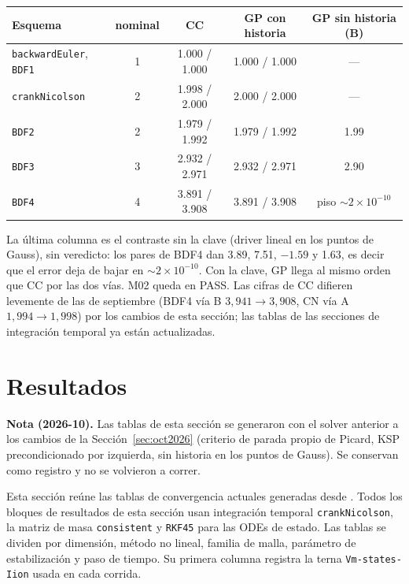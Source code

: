 \documentclass[11pt,a4paper]{article}
\newcommand{\code}[1]{\texttt{\small #1}}
\begin{document}
\begin{center}
\begin{tabular}{@{}lcccc@{}}
\toprule
Esquema & nominal & CC & GP con historia & GP sin historia (B) \\
\midrule
\code{backwardEuler}, \code{BDF1} & 1 & 1.000 / 1.000 & 1.000 / 1.000 & --- \\
\code{crankNicolson} & 2 & 1.998 / 2.000 & 2.000 / 2.000 & --- \\
\code{BDF2} & 2 & 1.979 / 1.992 & 1.979 / 1.992 & 1.99 \\
\code{BDF3} & 3 & 2.932 / 2.971 & 2.932 / 2.971 & 2.90 \\
\code{BDF4} & 4 & 3.891 / 3.908 & 3.891 / 3.908 & piso $\sim2\times10^{-10}$ \\
\bottomrule
\end{tabular}
\end{center}

La última columna es el contraste sin la clave (driver lineal en los puntos de Gauss), sin
veredicto: los pares de BDF4 dan 3.89, 7.51, $-1.59$ y 1.63, es decir que el error deja de
bajar en $\sim2\times10^{-10}$. Con la clave, GP llega al mismo orden que CC por las dos vías.
M02 queda en PASS. Las cifras de CC difieren levemente de las de septiembre (BDF4 vía B
$3{,}941\to3{,}908$, CN vía A $1{,}994\to1{,}998$) por los cambios de esta sección; las tablas
de las secciones de integración temporal ya están actualizadas.

\section{Resultados}
\label{sec:mms-results}

\textbf{Nota (2026-10).} Las tablas de esta sección se generaron con el solver anterior a los
cambios de la Sección~\ref{sec:oct2026} (criterio de parada propio de Picard, KSP
precondicionado por izquierda, sin historia en los puntos de Gauss). Se conservan como
registro y no se volvieron a correr.

Esta sección reúne las tablas de convergencia actuales generadas desde
.
Todos los bloques de resultados de esta sección usan integración temporal \code{crankNicolson},
la matriz de masa \code{consistent} y \code{RKF45} para las ODEs de estado. Las tablas se
dividen por dimensión, método no lineal, familia de malla, parámetro de estabilización y paso
de tiempo. Su primera columna registra la terna \code{Vm-states-Iion} usada en cada corrida.
\end{document}
